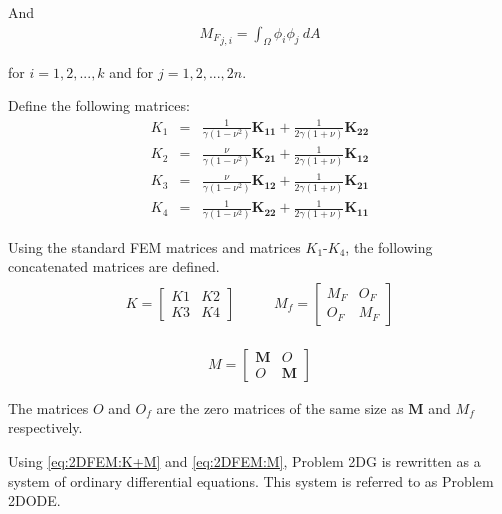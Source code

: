 And 
\begin{eqnarray*}
	{M_{F}}_{j,i} = \int_{\Omega}  \phi_i \phi_j~dA
\end{eqnarray*}

for $i = 1,2,...,k$ and for $j =1,2,...,2n$.

Define the following matrices:
\begin{eqnarray*}
	K_1 & = & \frac{1}{\gamma(1-\nu^2)} \mathbf{K_{11}} + \frac{1}{2\gamma(1+\nu)}\mathbf{K_{22}} \label{eq:2DFEM:K1} \\
	K_2 & = & \frac{\nu}{\gamma(1-\nu^2)} \mathbf{K_{21}} + \frac{1}{2\gamma(1+\nu)}\mathbf{K_{12}}\label{eq:2DFEM:K2}\\
	K_3 & = & \frac{\nu}{\gamma(1-\nu^2)} \mathbf{K_{12}} + \frac{1}{2\gamma(1+\nu)}\mathbf{K_{21}}\label{eq:2DFEM:K3}\\
	K_4 & = & \frac{1}{\gamma(1-\nu^2)} \mathbf{K_{22}} + \frac{1}{2\gamma(1+\nu)}\mathbf{K_{11}}\label{eq:2DFEM:K4}
\end{eqnarray*}

Using the standard FEM matrices and matrices $K_1$-$K_4$, the following concatenated matrices are defined.
\begin{eqnarray}
	\begin{aligned}
		K = 
		\begin{bmatrix}
			K1 & K2\\
			K3 & K4
		\end{bmatrix}
	\end{aligned}
	\ \ \ \ \ \ \ \ \
	\begin{aligned}
		M_f = 
		\begin{bmatrix}
			M_{F} & O_{F}\\
			O_{F} & M_{F}
		\end{bmatrix}
	\end{aligned}\label{eq:2DFEM:K+M}
\end{eqnarray}

\begin{eqnarray}
	M = 
	\begin{bmatrix}
		\mathbf{M} & O \\
		O & \mathbf{M}
	\end{bmatrix}\label{eq:2DFEM:M}
\end{eqnarray}

The matrices ${O}$ and ${O_f}$ are the zero matrices of the same size as $\mathbf{M}$ and ${M_f}$ respectively.

Using \eqref{eq:2DFEM:K+M} and \eqref{eq:2DFEM:M}, Problem 2DG is rewritten as a system of ordinary differential equations. This system is referred to as Problem 2DODE.

